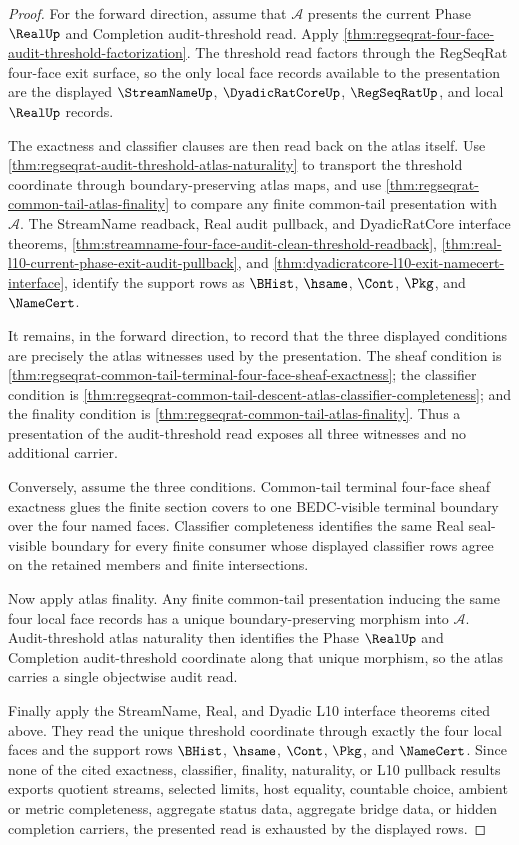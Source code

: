 \begin{proof}
For the forward direction, assume that $\mathcal A$ presents the current Phase $\RealUp$ and Completion audit-threshold read. Apply \autoref{thm:regseqrat-four-face-audit-threshold-factorization}. The threshold read factors through the RegSeqRat four-face exit surface, so the only local face records available to the presentation are the displayed $\StreamNameUp$, $\DyadicRatCoreUp$, $\RegSeqRatUp$, and local $\RealUp$ records.

The exactness and classifier clauses are then read back on the atlas itself. Use \autoref{thm:regseqrat-audit-threshold-atlas-naturality} to transport the threshold coordinate through boundary-preserving atlas maps, and use \autoref{thm:regseqrat-common-tail-atlas-finality} to compare any finite common-tail presentation with $\mathcal A$. The StreamName readback, Real audit pullback, and DyadicRatCore interface theorems, \autoref{thm:streamname-four-face-audit-clean-threshold-readback}, \autoref{thm:real-l10-current-phase-exit-audit-pullback}, and \autoref{thm:dyadicratcore-l10-exit-namecert-interface}, identify the support rows as $\BHist$, $\hsame$, $\Cont$, $\Pkg$, and $\NameCert$.

It remains, in the forward direction, to record that the three displayed conditions are precisely the atlas witnesses used by the presentation. The sheaf condition is \autoref{thm:regseqrat-common-tail-terminal-four-face-sheaf-exactness}; the classifier condition is \autoref{thm:regseqrat-common-tail-descent-atlas-classifier-completeness}; and the finality condition is \autoref{thm:regseqrat-common-tail-atlas-finality}. Thus a presentation of the audit-threshold read exposes all three witnesses and no additional carrier.

Conversely, assume the three conditions. Common-tail terminal four-face sheaf exactness glues the finite section covers to one BEDC-visible terminal boundary over the four named faces. Classifier completeness identifies the same Real seal-visible boundary for every finite consumer whose displayed classifier rows agree on the retained members and finite intersections.

Now apply atlas finality. Any finite common-tail presentation inducing the same four local face records has a unique boundary-preserving morphism into $\mathcal A$. Audit-threshold atlas naturality then identifies the Phase $\RealUp$ and Completion audit-threshold coordinate along that unique morphism, so the atlas carries a single objectwise audit read.

Finally apply the StreamName, Real, and Dyadic L10 interface theorems cited above. They read the unique threshold coordinate through exactly the four local faces and the support rows $\BHist$, $\hsame$, $\Cont$, $\Pkg$, and $\NameCert$. Since none of the cited exactness, classifier, finality, naturality, or L10 pullback results exports quotient streams, selected limits, host equality, countable choice, ambient or metric completeness, aggregate status data, aggregate bridge data, or hidden completion carriers, the presented read is exhausted by the displayed rows.
\end{proof}

